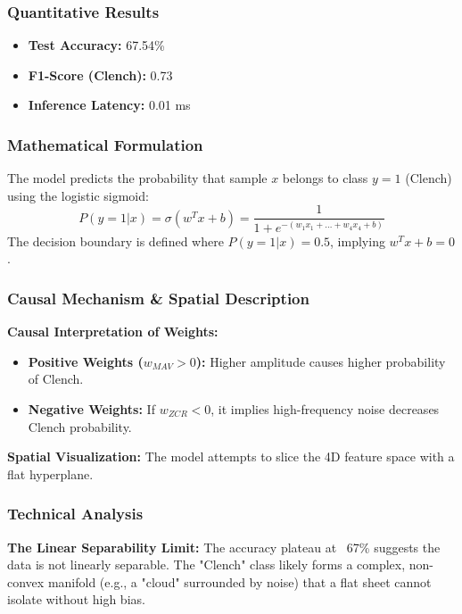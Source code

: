 \documentclass{article}
\begin{document}
\subsubsection{Quantitative Results}
\begin{itemize}
    \item \textbf{Test Accuracy:} 67.54\%
    \item \textbf{F1-Score (Clench):} 0.73
    \item \textbf{Inference Latency:} 0.01 ms
\end{itemize}

\subsubsection{Mathematical Formulation}
The model predicts the probability that sample $x$ belongs to class $y=1$ (Clench) using the logistic sigmoid:
\begin{equation}
    P(y=1|x) = \sigma(w^T x + b) = \frac{1}{1 + e^{-(w_1 x_1 + \dots + w_4 x_4 + b)}}
\end{equation}
The decision boundary is defined where $P(y=1|x) = 0.5$, implying $w^T x + b = 0$.

\subsubsection{Causal Mechanism \& Spatial Description}
\textbf{Causal Interpretation of Weights:}
\begin{itemize}
    \item \textbf{Positive Weights ($w_{MAV} > 0$):} Higher amplitude causes higher probability of Clench.
    \item \textbf{Negative Weights:} If $w_{ZCR} < 0$, it implies high-frequency noise decreases Clench probability.
\end{itemize}
\textbf{Spatial Visualization:} The model attempts to slice the 4D feature space with a flat hyperplane.

\subsubsection{Technical Analysis}
\textbf{The Linear Separability Limit:} The accuracy plateau at ~67\% suggests the data is not linearly separable. The "Clench" class likely forms a complex, non-convex manifold (e.g., a "cloud" surrounded by noise) that a flat sheet cannot isolate without high bias.
\end{document}
